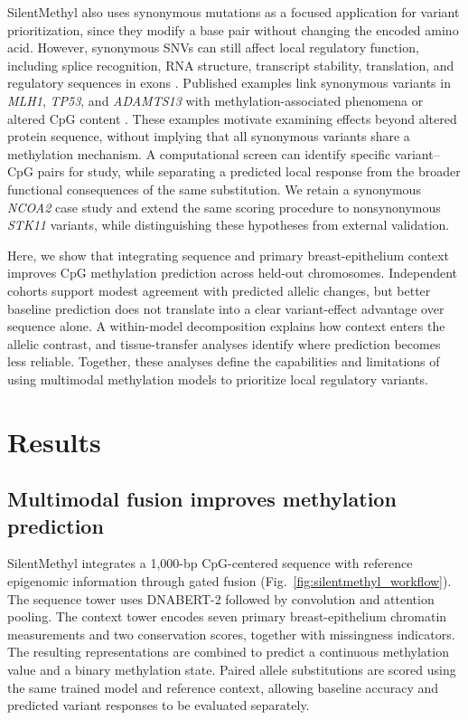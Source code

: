 \documentclass[11pt,letterpaper,twocolumn]{article}
\begin{document}
SilentMethyl also uses synonymous mutations as a focused application for variant prioritization, since they modify a base pair without changing the encoded amino acid. However, synonymous SNVs can still affect local regulatory function, including splice recognition, RNA structure, transcript stability, translation, and regulatory sequences in exons \cite{sauna2011understanding,stergachis2013exonic}. Published examples link synonymous variants in \textit{MLH1}, \textit{TP53}, and \textit{ADAMTS13} with methylation-associated phenomena or altered CpG content \cite{alvarez2025mlh1,blackburn2016tp53,jankowska2022adamts13}. These examples motivate examining effects beyond altered protein sequence, without implying that all synonymous variants share a methylation mechanism. A computational screen can identify specific variant--CpG pairs for study, while separating a predicted local response from the broader functional consequences of the same substitution. We retain a synonymous \textit{NCOA2} case study and extend the same scoring procedure to nonsynonymous \textit{STK11} variants, while distinguishing these hypotheses from external validation.

Here, we show that integrating sequence and primary breast-epithelium context improves CpG methylation prediction across held-out chromosomes. Independent cohorts support modest agreement with predicted allelic changes, but better baseline prediction does not translate into a clear variant-effect advantage over sequence alone. A within-model decomposition explains how context enters the allelic contrast, and tissue-transfer analyses identify where prediction becomes less reliable. Together, these analyses define the capabilities and limitations of using multimodal methylation models to prioritize local regulatory variants.

\section{Results}
\subsection{Multimodal fusion improves methylation prediction}
\label{sec:performance}
SilentMethyl integrates a 1,000-bp CpG-centered sequence with reference epigenomic information through gated fusion (Fig.~\ref{fig:silentmethyl_workflow}). The sequence tower uses DNABERT-2 followed by convolution and attention pooling. The context tower encodes seven primary breast-epithelium chromatin measurements and two conservation scores, together with missingness indicators. The resulting representations are combined to predict a continuous methylation value and a binary methylation state. Paired allele substitutions are scored using the same trained model and reference context, allowing baseline accuracy and predicted variant responses to be evaluated separately.
\end{document}
